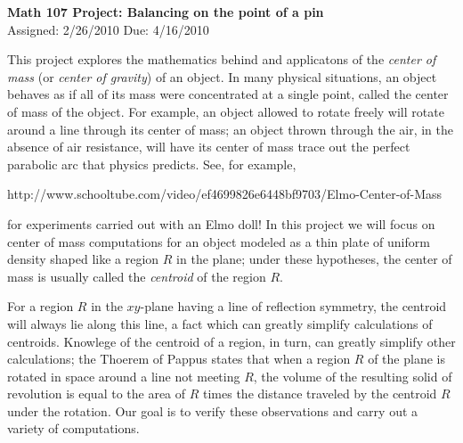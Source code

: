 \documentclass[12pt,reqno]{amsart}
\numberwithin{equation}{section} \theoremstyle{plain}
\begin{document}
\newcommand{\sgn}{\operatorname{sgn}}

\def\a{\alpha}
\def\b{\beta}
\def\d{\delta}
\def\g{\gamma}
\def\l{\lambda}
\def\o{\omega}
\def\s{\sigma}
\def\t{\tau}
\def\r{\rho}
\def\D{\Delta}
\def\G{\Gamma}
\def\O{\Omega}
\def\e{\epsilon}
\def\p{\phi}
\def\P{\Phi}
\def\S{\Psi}
\def\E{\eta}
\def\m{\mu}
\def\c{\chi}
\def\n{\nu}
\newcommand{\reals}{\mathbb{R}}
\newcommand{\naturals}{\mathbb{N}}
\newcommand{\ints}{\mathbb{Z}}
\newcommand{\complex}{\mathbb{C}}
\newcommand{\rationals}{\mathbb{Q}}
\newcommand{\innerprod}[1]{\left\langle#1\right\rangle}
\newcommand{\norm}[1]{\left\|#1\right\|}
\newcommand{\abs}[1]{\left|#1\right|}

\begin{center}
 {\bf  Math 107 Project: Balancing on the point of a pin}\\
 Assigned: 2/26/2010 \hfill Due: 4/16/2010
\end{center}
\hrulefill

This project explores the mathematics behind and applicatons of the
{\it center of mass} (or {\it center of gravity}) of an object.
In many physical situations, an object behaves as if all of its mass
were concentrated at a single point, called the center of mass of the
object. For example, an object allowed to rotate freely will rotate around 
a line through its 
center of mass; an object thrown through the air, in the absence of air 
resistance, will have its center of mass trace out 
the perfect parabolic arc that physics predicts. See, for example,\\
\centerline{http://www.schooltube.com/video/ef4699826e6448bf9703/Elmo-Center-of-Mass}  

\noindent for experiments carried out with an Elmo doll! 
In this project we will focus on center of mass computations for an object
modeled as a thin plate of uniform density shaped like a region $R$
in the plane; under these hypotheses, the center of mass is usually called the {\it centroid}
of the region $R$.

For  a region $R$ in the $xy$-plane having a 
line of reflection symmetry, the centroid will always lie along this line, a fact which 
can greatly simplify calculations of centroids. Knowlege of the centroid of a 
region, in turn, can greatly simplify other calculations; the Thoerem of Pappus
states that when a region $R$ of the plane is rotated  in space around a line not meeting
$R$, the volume of the resulting solid of revolution is equal to the area of $R$
times the distance traveled by the centroid $R$ under the rotation. Our goal 
is to verify these observations and carry out a variety of computations.
\end{document}
